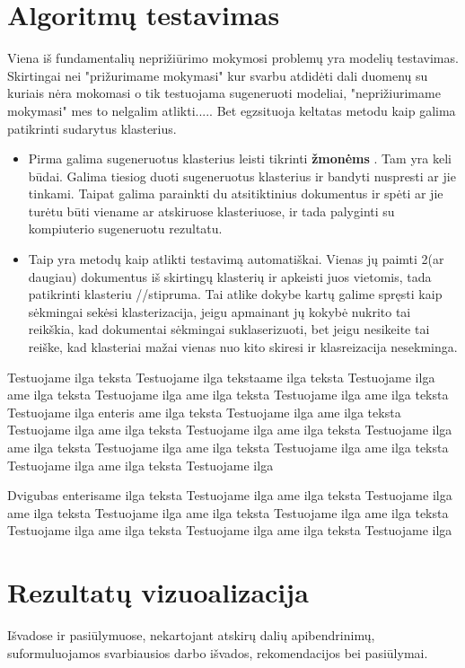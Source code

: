 \documentclass{VUMIFInfKursinis}
\begin{document}
\section{Algoritmų testavimas}
Viena iš fundamentalių neprižiūrimo mokymosi problemų yra modelių testavimas. Skirtingai nei "prižurimame mokymasi" kur svarbu atdidėti dali duomenų su kuriais nėra mokomasi o tik testuojama sugeneruoti modeliai, "neprižiurimame mokymasi" mes to nelgalim atlikti..... Bet egzsituoja keltatas metodu kaip galima patikrinti sudarytus klasterius.
\begin{itemize}
	\item Pirma galima sugeneruotus klasterius leisti tikrinti \textbf{žmonėms }. Tam yra keli būdai. Galima tiesiog duoti sugeneruotus klasterius ir bandyti nuspresti ar jie tinkami. Taipat galima parainkti du atsitiktinius dokumentus ir spėti ar jie turėtu būti viename ar atskiruose klasteriuose, ir tada palyginti su kompiuterio sugeneruotu rezultatu. 
	\item Taip yra metodų kaip atlikti testavimą automatiškai. Vienas jų paimti 2(ar daugiau) dokumentus iš skirtingų klasterių ir apkeisti juos vietomis, tada patikrinti klasteriu //stipruma. Tai atlike dokybe kartų galime spręsti kaip sėkmingai sekėsi klasterizacija, jeigu apmainant jų kokybė nukrito tai reikškia, kad dokumentai sėkmingai suklaserizuoti, bet jeigu nesikeite tai reiške, kad klasteriai mažai vienas nuo kito skiresi ir klasreizacija nesekminga.
\end{itemize}
Testuojame ilga teksta Testuojame ilga tekstaame ilga teksta Testuojame ilga ame ilga teksta Testuojame ilga ame ilga teksta Testuojame ilga ame ilga teksta Testuojame ilga 
enteris ame ilga teksta Testuojame ilga ame ilga teksta Testuojame ilga ame ilga teksta Testuojame ilga ame ilga teksta Testuojame ilga ame ilga teksta Testuojame ilga ame ilga teksta Testuojame ilga ame ilga teksta Testuojame ilga ame ilga teksta Testuojame ilga

Dvigubas enterisame ilga teksta Testuojame ilga ame ilga teksta Testuojame ilga ame ilga teksta Testuojame ilga ame ilga teksta Testuojame ilga ame ilga teksta Testuojame ilga ame ilga teksta Testuojame ilga ame ilga teksta Testuojame ilga 
\section{Rezultatų vizuoalizacija}

Išvadose ir pasiūlymuose, nekartojant atskirų dalių apibendrinimų,
suformuluojamos svarbiausios darbo išvados, rekomendacijos bei pasiūlymai.
\end{document}
